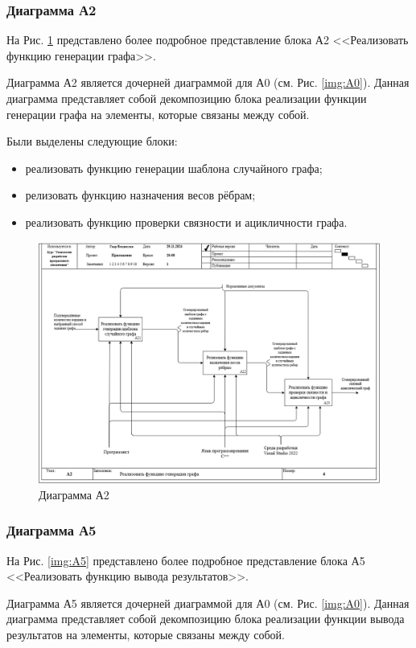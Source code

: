 \documentclass[a4paper, final]{article}
\begin{document}
\subsubsection{Диаграмма А2}
На Рис. \ref{img:A2} представлено более подробное представление блока А2 <<Реализовать функцию генерации графа>>.

Диаграмма А2 является дочерней диаграммой для А0 (см. Рис. \ref{img:A0}). Данная диаграмма представляет собой декомпозицию
блока реализации функции генерации графа на элементы, которые связаны между собой. 

Были выделены следующие блоки:
\begin{itemize}
	\item реализовать функцию генерации шаблона случайного графа;
	\item релизовать функцию назначения весов рёбрам;
	\item реализовать функцию проверки связности и ацикличности графа.
\end{itemize} 

\newpage
\begin{figure}[H]
	\centering
	\includegraphics[width=\linewidth]{A2.png}
	\caption{Диаграмма А2}
	\label{img:A2}
\end{figure}

\subsubsection{Диаграмма А5}
На Рис. \ref{img:A5} представлено более подробное представление блока А5 <<Реализовать функцию вывода результатов>>.

Диаграмма А5 является дочерней диаграммой для А0 (см. Рис. \ref{img:A0}). Данная диаграмма представляет собой декомпозицию
блока реализации функции вывода результатов на элементы, которые связаны между собой. 
\end{document}

